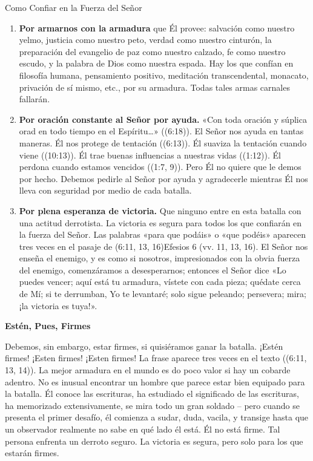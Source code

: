 \documentclass[12pt, twoside, openright]{book}
\begin{document}
Como Confiar en la Fuerza del Señor
\begin{enumerate}
\item \textbf{Por armarnos con la armadura} que Él provee: salvación como nuestro yelmo, justicia como nuestro peto, verdad como nuestro cinturón, la preparación del evangelio de paz como nuestro calzado, fe como nuestro escudo, y la palabra de Dios como nuestra espada. Hay los que confían en filosofía humana, pensamiento positivo, meditación transcendental, monacato, privación de sí mismo, etc., por su armadura. Todas tales armas carnales fallarán. 
\item \textbf{Por oración constante al Señor por ayuda.} «Con toda oración y súplica orad en todo tiempo en el Espíritu…» ((6:18)). El Señor nos ayuda en tantas maneras. Él nos protege de tentación ((6:13)). Él suaviza la tentación cuando viene ((10:13)). Él trae buenas influencias a nuestras vidas ((1:12)). Él perdona cuando estamos vencidos ((1:7, 9)). Pero Él no quiere que le demos por hecho. Debemos pedirle al Señor por ayuda y agradecerle mientras Él nos lleva con seguridad por medio de cada batalla. 
\item \textbf{Por plena esperanza de victoria.} Que ninguno entre en esta batalla con una actitud derrotista. La victoria es segura para todos los que confiarán en la fuerza del Señor. Las palabras «para que podáis» o «que podéis» aparecen tres veces en el pasaje de (6:11, 13, 16)Efesios 6 (vv. 11, 13, 16). El Señor nos enseña el enemigo, y es como si nosotros, impresionados con la obvia fuerza del enemigo, comenzáramos a desesperarnos; entonces el Señor dice «Lo puedes vencer; aquí está tu armadura, vístete con cada pieza; quédate cerca de Mí; si te derrumban, Yo te levantaré; solo sigue peleando; persevera; mira; ¡la victoria es tuya!».
\end{enumerate}
\textbf{Estén, Pues, Firmes}

Debemos, sin embargo, estar firmes, si quisiéramos ganar la batalla. ¡Estén firmes! ¡Esten firmes! ¡Esten firmes! La frase aparece tres veces en el texto ((6:11, 13, 14)). La mejor armadura en el mundo es do poco valor si hay un cobarde adentro. No es inusual encontrar un hombre que parece estar bien equipado para la batalla. Él conoce las escrituras, ha estudiado el significado de las escrituras, ha memorizado extensivamente, se mira todo un gran soldado – pero cuando se presenta el primer desafío, él comienza a sudar, duda, vacila, y transige hasta que un observador realmente no sabe en qué lado él está. Él no está firme. Tal persona enfrenta un derroto seguro. La victoria es segura, pero solo para los que estarán firmes. 
\end{document}
